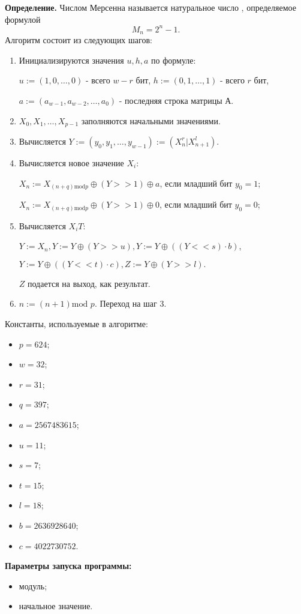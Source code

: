\documentclass[spec, och, labwork]{shiza}
\begin{document}
\textbf{Определение.} Числом Мерсенна называется натуральное число , определяемое формулой
\begin{equation}
  M_n = 2^n - 1.
\end{equation}
Алгоритм состоит из следующих шагов:
\begin{enumerate}
  \item Инициализируются значения $u, h, a$ по формуле:

  $u:=(1,0,\dots,0)$ - всего $w-r$ бит, $h:=(0,1,\dots,1)$ - всего $r$ бит,

  $a:=(a_{w-1}, a_{w-2}, \dots, a_0)$ - последняя строка матрицы $А$.
  \item $X_0, X_1, \dots, X_{p-1}$ заполняются начальными значениями.
  \item Вычисляется $Y:=(y_0, y_1, \dots, y_{w-1}):=(X^r_n | X^l_{n+1})$.
  \item Вычисляется новое значение $X_i$:
  
  $X_n := X_{(n+q) \text{mod} p} \oplus (Y >> 1) \oplus a$, если младший бит $y_0=1$;

  $X_n := X_{(n+q) \text{mod} p} \oplus (Y >> 1) \oplus 0$, если младший бит $y_0=0$;
  \item Вычисляется $X_iT$:
  
  $Y:=X_n, Y:=Y \oplus (Y >> u), Y:=Y \oplus ((Y << s) \cdot b)$,

  $Y:=Y \oplus ((Y << t) \cdot c), Z:=Y \oplus (Y >> l).$

  $Z$ подается на выход, как результат.
  \item $n:=(n+1) \text{mod } p$. Переход на шаг 3.
\end{enumerate}

Константы, используемые в алгоритме:
\begin{itemize}
  \item $p = 624$;
  \item $w = 32$;
  \item $r = 31$;
  \item $q = 397$;
  \item $a = 2567483615$;
  \item $u = 11$;
  \item $s = 7$;
  \item $t = 15$;
  \item $l = 18$;
  \item $b = 2636928640$;
  \item $c = 4022730752$.
\end{itemize}

\textbf{Параметры запуска программы:}
\begin{itemize}
  \item модуль;
  \item начальное значение.
\end{itemize}
\end{document}
